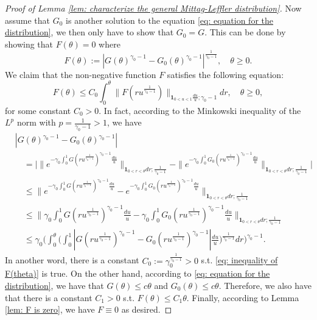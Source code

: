 \documentclass[12pt, a4paper]{amsart}
\theoremstyle{definition}
\numberwithin{equation}{section}
\begin{document}
\begin{proof}[Proof of Lemma \ref{lem: characterize the general Mittag-Leffler distribution}]
	Now assume that $G_0$ is another solution to the equation \eqref{eq: equation for the distribution}, we then only have to show that $G_0 = G$.
	This can be done by showing that $F(\theta) = 0$ where
\[
		F(\theta) := |G(\theta)^{\gamma_0 - 1} - G_0(\theta)^{\gamma_0 - 1}|^{\frac{1}{\gamma_0 - 1}},
		\quad \theta \geq 0.
\]
	We claim that the non-negative function $F$ satisfies the following equation:
\[\label{eq: inequality of F(theta)}
	F(\theta)
	\leq C_0 \int_0^\theta \|  F(ru^{\frac{1}{\gamma_0 - 1}})\|_{\mathbf 1_{0<u<1}\frac{du}{u}; \gamma_0 - 1} dr, \quad \theta \geq 0,
\]
	for some constant $C_0 > 0$.
	In fact, according to the Minkowski inequality of the $L^p$ norm with $p = \frac{1}{\gamma_0 - 1} > 1$, we have
\[\begin{split}
	&|G(\theta)^{\gamma_0 - 1} - G_0(\theta)^{\gamma_0 - 1}|
	\\&\quad = \Big| \|e^{-\gamma_0\int_0^1 G(ru^{\frac{1}{\gamma_0 - 1}})^{\gamma_0 - 1} \frac{du}{u}} \|_{\mathbf 1_{0<r<\theta}dr;\frac{1}{\gamma_0 - 1}} - \|e^{-\gamma_0\int_0^1 G_0(ru^{\frac{1}{\gamma_0 - 1}})^{\gamma_0 - 1} \frac{du}{u}} \|_{\mathbf 1_{0<r<\theta}dr;\frac{1}{\gamma_0 - 1}} \Big|
	\\ & \quad \leq \| e^{-\gamma_0\int_0^1 G(ru^{\frac{1}{\gamma_0 - 1}})^{\gamma_0 - 1} \frac{du}{u}} - e^{-\gamma_0\int_0^1 G_0(ru^{\frac{1}{\gamma_0 - 1}})^{\gamma_0 - 1} \frac{du}{u}} \|_{\mathbf 1_{0<r<\theta}dr;\frac{1}{\gamma_0 - 1}}
	\\ & \quad \leq \Big\| \gamma_0\int_0^1 G(ru^{\frac{1}{\gamma_0 - 1}})^{\gamma_0 - 1} \frac{du}{u} - \gamma_0\int_0^1 G_0(ru^{\frac{1}{\gamma_0 - 1}})^{\gamma_0 - 1} \frac{du}{u} \Big\|_{\mathbf 1_{0<r<\theta}dr;\frac{1}{\gamma_0 - 1}}
	\\ & \quad \leq \gamma_0 \Big( \int_0^\theta \Big( \int_0^1 |G(ru^{\frac{1}{\gamma_0 - 1}})^{\gamma_0 - 1} - G_0(ru^{\frac{1}{\gamma_0 - 1}})^{\gamma_0 - 1}| \frac{du}{u} \Big)^{\frac{1}{\gamma_0 - 1}} dr \Big)^{\gamma_0 - 1}.
\end{split}\]
	In another word, there is a constant $C_0:= \gamma_0^{\frac{1}{\gamma_0 - 1}}>0$ s.t. \eqref{eq: inequality of F(theta)} is true.
	On the other hand, according to \eqref{eq: equation for the distribution}, we have that $G(\theta) \leq c\theta$ and $G_0(\theta) \leq c \theta$.
	Therefore, we also have that there is a constant $C_1 > 0$ s.t. $F(\theta) \leq C_1 \theta$.
	Finally, according to Lemma \ref{lem: F is zero}, we have $F \equiv 0$ as desired.
\end{proof}
\end{document}
